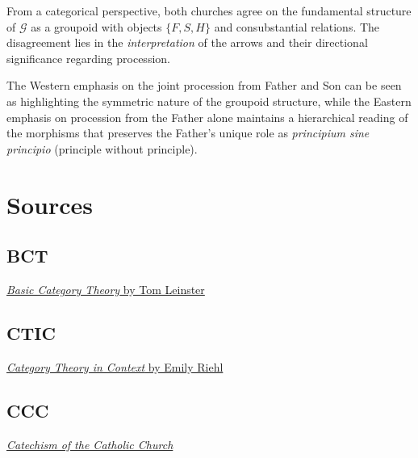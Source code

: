 \documentclass[11pt]{article}
\begin{document}
From a categorical perspective, both churches agree on the fundamental structure of $\mathcal{G}$ as a groupoid with objects $\{F, S, H\}$ and consubstantial relations. The disagreement lies in the \emph{interpretation} of the arrows and their directional significance regarding procession.

The Western emphasis on the joint procession from Father and Son can be seen as highlighting the symmetric nature of the groupoid structure, while the Eastern emphasis on procession from the Father alone maintains a hierarchical reading of the morphisms that preserves the Father's unique role as \emph{principium sine principio} (principle without principle).

\section{Sources}
\label{sec:sources}

\subsection{BCT}
\label{sec:bct}
\href{https://arxiv.org/pdf/1612.09375#page=18}{\emph{Basic Category Theory} by Tom Leinster}

\subsection{CTIC}
\label{sec:ctic}
\href{https://emilyriehl.github.io/files/context.pdf}{\emph{Category Theory in Context} by Emily Riehl}

\subsection{CCC}
\label{sec:ccc}
\href{https://www.vatican.va/archive/ENG0015/_INDEX.HTM}{\emph{Catechism of the Catholic Church}}
\end{document}

